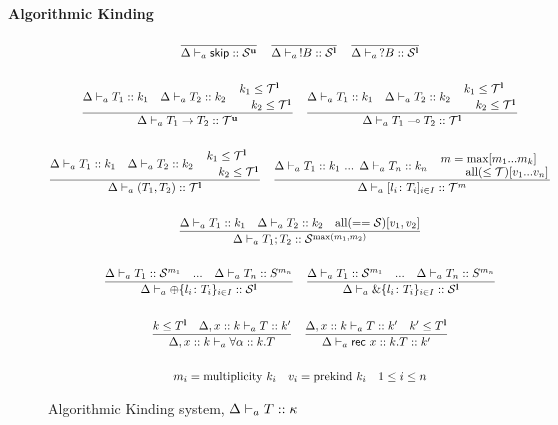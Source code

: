 \documentclass[12pt,openright,twoside]{report}
\begin{document}
	\begin{center}
		\textbf{Algorithmic Kinding}
	\end{center}

\begin{figure}[ht]
\centering
  \begin{gather*}
	\frac{}{\Delta \Alg \skipk :: \kinds^\Unrestricted} \quad
	\frac{}{\Delta \Alg \,!B :: \kinds^\Linear} \quad \frac{}{\Delta
			\Alg \,?B :: \kinds^\Linear}
    \\\\
    \frac{\Delta \Alg T_1 :: k_1 \quad \Delta \Alg T_2 :: k_2 \quad \splitdfrac{k_1 \le \kindt^\Linear}{k_2 \le \kindt^\Linear}}
    	{\Delta \Alg T_1 \to T_2 :: \kindt^\Unrestricted}	
	\quad
    \frac{\Delta \Alg T_1 :: k_1 \quad \Delta \Alg T_2 :: k_2 \quad \splitdfrac{k_1 \le \kindt^\Linear}{k_2 \le \kindt^\Linear}}
    	{\Delta \Alg T_1 \multimap T_2 :: \kindt^\Linear}	
    \\\\
    \frac{\Delta \Alg T_1 :: k_1 \quad \Delta \Alg T_2 :: k_2 \quad \splitdfrac{k_1 \le \kindt^\Linear}{k_2 \le \kindt^\Linear}}
    	{\Delta \Alg (T_1,T_2) :: \kindt^\Linear}	
	\quad
    \frac{\Delta \Alg T_1 :: k_1 \mbox{ ... } \Delta \Alg T_n :: k_n \quad 
    	\splitfrac{m=\mbox{max}[m_1 ... m_k]}{\mbox{all}(\le \kindt)[v_1 ... v_n]}}
    	{\Delta \Alg [l_i\colon T_i]_{i\in I} :: \kindt^m}	
	\\\\
	\frac{\Delta \Alg T_1 :: k_1 \quad \Delta \Alg T_2 :: k_2 \quad \mbox{all}(== \kinds)[v_1,v_2]}
    	{\Delta \Alg T_1;T_2 :: \kinds^{\max(m_1, m_2)}}	    
	\\\\
		\frac{\Delta \Alg T_1 :: \kinds^{m_1} \quad \mbox{...} \quad \Delta \Alg T_n :: S^{m_n}}{
      \Delta \Alg \oplus\{l_i\colon T_i\}_{i\in I} :: \kinds^\Linear}
    \quad
    \frac{\Delta \Alg T_1 :: \kinds^{m_1} \quad \mbox{...} \quad \Delta \Alg T_n :: S^{m_n}}
    { \Delta \Alg \&\{l_i\colon T_i\}_{i\in I} :: \kinds^\Linear}
	\\\\
	 \frac{k \le T^\Linear \quad \Delta, x :: k \Alg T :: k'}
    { \Delta, x :: k \Alg \forall \alpha :: k.T }
	\quad
	\frac{\Delta, x :: k \Alg T :: k' \quad k' \le T^{\Linear}}
	    { \Delta \Alg \recc \mbox{ } x :: k.T :: k'}
	 \\\\
	m_i = \mbox{multiplicity } k_i \quad v_i = \mbox{prekind } k_i \quad 1 \le i \le n 
	\end{gather*}
  \caption{Algorithmic Kinding system, $\Delta \vdash_{a} T :: \kappa$}
  \label{fig:kinding}
\end{figure}
 
%



\end{document}
